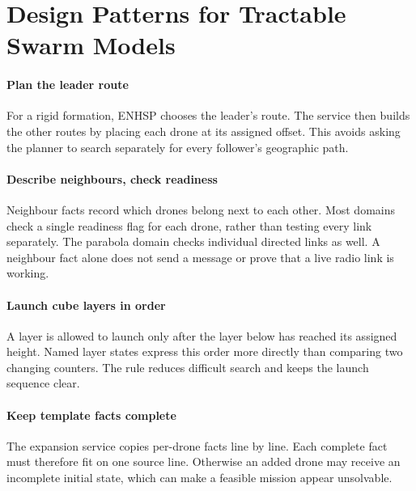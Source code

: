 \documentclass[11pt,a4paper,oneside]{report}
\begin{document}
\section{Design Patterns for Tractable Swarm Models}
\paragraph{Plan the leader route}
For a rigid formation, ENHSP chooses the leader's route. The service then builds
the other routes by placing each drone at its assigned offset. This avoids asking
the planner to search separately for every follower's geographic path.

\paragraph{Describe neighbours, check readiness}
Neighbour facts record which drones belong next to each other. Most domains check
a single readiness flag for each drone, rather than testing every link separately.
The parabola domain checks individual directed links as well. A neighbour fact
alone does not send a message or prove that a live radio link is working.

\paragraph{Launch cube layers in order}
A layer is allowed to launch only after the layer below has reached its assigned
height. Named layer states express this order more directly than comparing two
changing counters. The rule reduces difficult search and keeps the launch sequence clear.

\paragraph{Keep template facts complete}
The expansion service copies per-drone facts line by line. Each complete fact
must therefore fit on one source line. Otherwise an added drone may receive an
incomplete initial state, which can make a feasible mission appear unsolvable.

\end{document}
